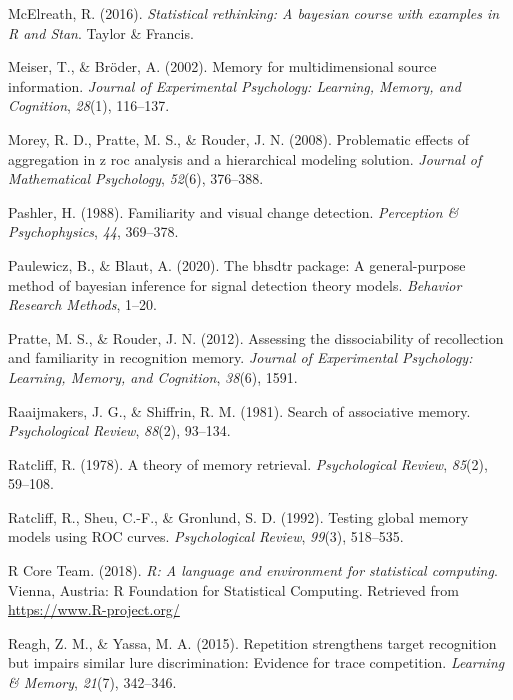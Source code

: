 \documentclass[
  english,
  ,man,floatsintext]{apa6}
\begin{document}
\leavevmode\hypertarget{ref-McElreath2016}{}%
McElreath, R. (2016). \emph{Statistical rethinking: A bayesian course with examples in R and Stan}. Taylor \& Francis.

\leavevmode\hypertarget{ref-MeiserAndBroder2002}{}%
Meiser, T., \& Bröder, A. (2002). Memory for multidimensional source information. \emph{Journal of Experimental Psychology: Learning, Memory, and Cognition}, \emph{28}(1), 116--137.

\leavevmode\hypertarget{ref-morey2008problematic}{}%
Morey, R. D., Pratte, M. S., \& Rouder, J. N. (2008). Problematic effects of aggregation in z roc analysis and a hierarchical modeling solution. \emph{Journal of Mathematical Psychology}, \emph{52}(6), 376--388.

\leavevmode\hypertarget{ref-Pashler1988}{}%
Pashler, H. (1988). Familiarity and visual change detection. \emph{Perception \& Psychophysics}, \emph{44}, 369--378.

\leavevmode\hypertarget{ref-paulewicz2020bhsdtr}{}%
Paulewicz, B., \& Blaut, A. (2020). The bhsdtr package: A general-purpose method of bayesian inference for signal detection theory models. \emph{Behavior Research Methods}, 1--20.

\leavevmode\hypertarget{ref-pratte2012assessing}{}%
Pratte, M. S., \& Rouder, J. N. (2012). Assessing the dissociability of recollection and familiarity in recognition memory. \emph{Journal of Experimental Psychology: Learning, Memory, and Cognition}, \emph{38}(6), 1591.

\leavevmode\hypertarget{ref-RaaijmakersAndShiffrin1981}{}%
Raaijmakers, J. G., \& Shiffrin, R. M. (1981). Search of associative memory. \emph{Psychological Review}, \emph{88}(2), 93--134.

\leavevmode\hypertarget{ref-Ratcliff1978}{}%
Ratcliff, R. (1978). A theory of memory retrieval. \emph{Psychological Review}, \emph{85}(2), 59--108.

\leavevmode\hypertarget{ref-RatcliffEtAl1992}{}%
Ratcliff, R., Sheu, C.-F., \& Gronlund, S. D. (1992). Testing global memory models using ROC curves. \emph{Psychological Review}, \emph{99}(3), 518--535.

\leavevmode\hypertarget{ref-rteam}{}%
R Core Team. (2018). \emph{R: A language and environment for statistical computing}. Vienna, Austria: R Foundation for Statistical Computing. Retrieved from \url{https://www.R-project.org/}

\leavevmode\hypertarget{ref-ReaghAndYassa2014}{}%
Reagh, Z. M., \& Yassa, M. A. (2015). Repetition strengthens target recognition but impairs similar lure discrimination: Evidence for trace competition. \emph{Learning \& Memory}, \emph{21}(7), 342--346.
\end{document}
